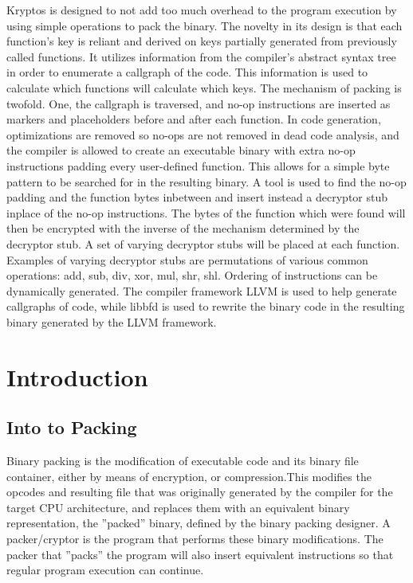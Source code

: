 \documentclass{article}
\begin{document}
Kryptos is designed to not add too much overhead to the program execution by using simple operations to pack the binary. The novelty in its design is that each function's key is reliant and derived on keys partially generated from previously called functions. It utilizes information from the compiler's abstract syntax tree in order to enumerate a callgraph of the code. This information is used to calculate which functions will calculate which keys. The mechanism of packing is twofold. One, the callgraph is traversed, and no-op instructions are inserted as markers and placeholders before and after each function. In code generation, optimizations are removed so no-ops are not removed in dead code analysis, and the compiler is allowed to create an executable binary with extra no-op instructions padding every user-defined function. This allows for a simple byte pattern to be searched for in the resulting binary. A tool is used to find the no-op padding and the function bytes inbetween and insert instead a decryptor stub inplace of the no-op instructions. The bytes of the function which were found will then be encrypted with the inverse of the mechanism determined by the decryptor stub. A set of varying decryptor stubs will be placed at each function. Examples of varying decryptor stubs are permutations of various common operations: add, sub, div, xor, mul, shr, shl. Ordering of instructions can be dynamically generated. The compiler framework LLVM is used to help generate callgraphs of code, while libbfd is used to rewrite the binary code in the resulting binary generated by the LLVM framework.\newpage

\section {Introduction}
\subsection{Into to Packing}
Binary packing is the modification of executable code and its binary file container, either by means of encryption, or compression.This modifies the opcodes and resulting file that was originally generated by the compiler for the target CPU architecture, and replaces them with an equivalent binary representation, the ''packed'' binary, defined by the binary packing designer. A packer/cryptor is the program that performs these binary modifications. The packer that ''packs'' the program will also insert equivalent instructions so that regular program execution can continue. \newline
\end{document}
